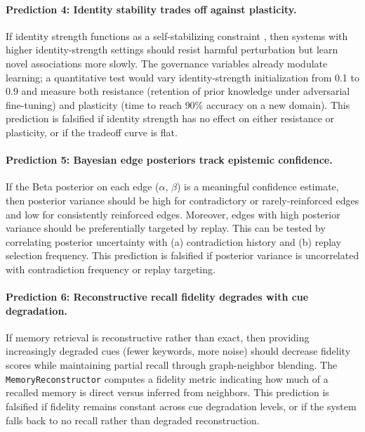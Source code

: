 \documentclass[11pt]{article}
\begin{document}
\paragraph{Prediction 4: Identity stability trades off against plasticity.}
If identity strength functions as a self-stabilizing constraint \cite{grossberg1980}, then systems with higher identity-strength settings should resist harmful perturbation but learn novel associations more slowly. The governance variables already modulate learning; a quantitative test would vary identity-strength initialization from 0.1 to 0.9 and measure both resistance (retention of prior knowledge under adversarial fine-tuning) and plasticity (time to reach 90\% accuracy on a new domain). This prediction is falsified if identity strength has no effect on either resistance or plasticity, or if the tradeoff curve is flat.

\paragraph{Prediction 5: Bayesian edge posteriors track epistemic confidence.}
If the Beta posterior on each edge ($\alpha$, $\beta$) is a meaningful confidence estimate, then posterior variance should be high for contradictory or rarely-reinforced edges and low for consistently reinforced edges. Moreover, edges with high posterior variance should be preferentially targeted by replay. This can be tested by correlating posterior uncertainty with (a) contradiction history and (b) replay selection frequency. This prediction is falsified if posterior variance is uncorrelated with contradiction frequency or replay targeting.

\paragraph{Prediction 6: Reconstructive recall fidelity degrades with cue degradation.}
If memory retrieval is reconstructive rather than exact, then providing increasingly degraded cues (fewer keywords, more noise) should decrease fidelity scores while maintaining partial recall through graph-neighbor blending. The \texttt{MemoryReconstructor} computes a fidelity metric indicating how much of a recalled memory is direct versus inferred from neighbors. This prediction is falsified if fidelity remains constant across cue degradation levels, or if the system falls back to no recall rather than degraded reconstruction.
\end{document}
